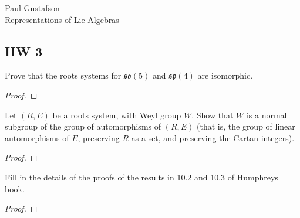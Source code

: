 \documentclass{article}
\newcommand{\mf}{\mathfrak}
\begin{document}
\noindent Paul Gustafson\\
\noindent Representations of Lie Algebras


\subsection*{HW 3}
\p Prove that the roots systems for $\mf{so}(5)$ and $\mf{sp}(4)$ are isomorphic.

\begin{proof}

\end{proof}

\p Let $(R,E)$ be a roots system, with Weyl group $W$.  Show that $W$ is a normal subgroup of the group of automorphisms of $(R,E)$ (that is, the group of linear automorphisms of $E$, preserving $R$ as a set, and preserving the Cartan integers). 

\begin{proof}
\end{proof}

\p Fill in the details of the proofs of the results in 10.2 and 10.3 of Humphreys book.

\begin{proof}
\end{proof}
\end{document}
